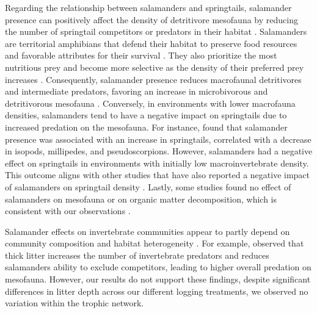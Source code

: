 Regarding the relationship between salamanders and springtails, salamander presence can positively affect the density of detritivore mesofauna by reducing the number of springtail competitors or predators in their habitat \citep{Wyman1998Experimentalassessment,Rooney2000impactsalamander,Walton2005Contrastingeffects,Walton2006Salamandersforestfloor}. 
Salamanders are territorial amphibians that defend their habitat to preserve food resources and favorable attributes for their survival \citep{Gall2003BehavioralInteractions,Hickerson2004Behavioralinteractions,Hickerson2012Interactionsforestfloor}. 
They also prioritize the most nutritious prey and become more selective as the density of their preferred prey increases \citep{Jaeger1981Foragingtactics,Jaeger1982ForagingTactics}. 
Consequently, salamander presence reduces macrofaunal detritivores and intermediate predators, favoring an increase in microbivorous and detritivorous mesofauna \citep{Rooney2000impactsalamander,Walton2005Contrastingeffects,Walton2006Salamandersforestfloor}. 
Conversely, in environments with lower macrofauna densities, salamanders tend to have a negative impact on springtails due to increased predation on the mesofauna. 
For instance, \cite{Walton2006Salamandersforestfloor} found that salamander presence was associated with an increase in springtails, correlated with a decrease in isopods, millipedes, and pseudoscorpions.  
However, salamanders had a negative effect on springtails in environments with initially low macroinvertebrate density. 
This outcome aligns with other studies that have also reported a negative impact of salamanders on springtail density \citep{Hickerson2017Easternredbacked}. 
Lastly, some studies found no effect of salamanders on mesofauna or on organic matter decomposition, which is consistent with our observations \citep{Hocking2013Effectsexperimental,Hocking2014Effectsredbacked}.

Salamander effects on invertebrate communities appear to partly depend on community composition and habitat heterogeneity \citep{MichaelWaltonSalamandersforestfloor2005,Walton2006Salamandersforestfloor,Walton2013Topregulationlitter,Best2014trophicrole}. 
For example, \cite{Walton2013Topregulationlitter} observed that thick litter increases the number of invertebrate predators and reduces salamanders ability to exclude competitors, leading to higher overall predation on mesofauna. 
However, our results do not support these findings, despite significant differences in litter depth across our different logging treatments, we observed no variation within the trophic network.


